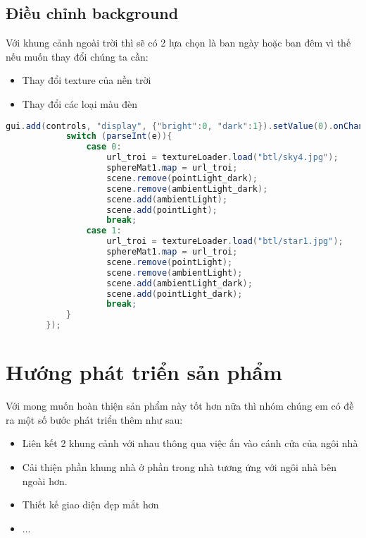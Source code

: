\subsection{Điều chỉnh background}
Với khung cảnh ngoài trời thì sẽ có 2 lựa chọn là ban ngày hoặc ban đêm vì thế nếu muốn thay đổi chúng ta cần:
\begin{itemize}
    \item Thay đổi texture của nền trời
    \item Thay đổi các loại màu đèn 
\end{itemize}
\begin{lstlisting}[language = java]
 gui.add(controls, "display", {"bright":0, "dark":1}).setValue(0).onChange(function(e){
            switch (parseInt(e)){
                case 0:
                    url_troi = textureLoader.load("btl/sky4.jpg");
                    sphereMat1.map = url_troi;
                    scene.remove(pointLight_dark);
                    scene.remove(ambientLight_dark);
                    scene.add(ambientLight);
                    scene.add(pointLight); 
                    break;
                case 1: 
                    url_troi = textureLoader.load("btl/star1.jpg");
                    sphereMat1.map = url_troi;
                    scene.remove(pointLight);
                    scene.remove(ambientLight);
                    scene.add(ambientLight_dark);
                    scene.add(pointLight_dark);
                    break;
            }
        });
\end{lstlisting}

\newpage
\section{Hướng phát triển sản phẩm}
Với mong muốn hoàn thiện sản phẩm này tốt hơn nữa thì nhóm chúng em có đề ra một số bước phát triển thêm như sau:
\begin{itemize}
    \item Liên kết 2 khung cảnh với nhau thông qua việc ấn vào cánh cửa của ngôi nhà
    \item Cải thiện phần khung nhà ở phần trong nhà tương ứng với ngôi nhà bên ngoài hơn.
    \item Thiết kế giao diện đẹp mắt hơn
    \item ...

\end{itemize}